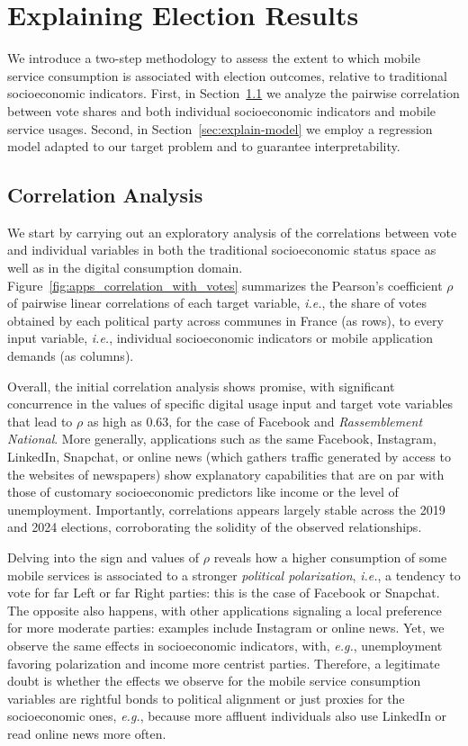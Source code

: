 \documentclass[9pt,sigconf,letterpaper]{acmart}
\newcommand{\eg}{\textit{e.g.},\xspace}
\newcommand{\ie}{\textit{i.e.},\xspace}
\newcommand{\RN}{\textsl{Rassemblement National}\xspace}
\begin{document}
\section{Explaining Election Results}
\label{sec:explain}

We introduce a two-step methodology to assess the extent to which mobile service consumption is associated with election outcomes, relative to traditional socioeconomic indicators.
First, in Section~\ref{sec:explain-correlation} we analyze the pairwise correlation between vote shares and both individual socioeconomic indicators and mobile service usages.
Second, in Section~\ref{sec:explain-model} we employ a regression model adapted to our target problem and to guarantee interpretability.

\subsection{Correlation Analysis}
\label{sec:explain-correlation}

We start by carrying out an exploratory analysis of the correlations between vote and individual variables in both the traditional socioeconomic status space as well as in the digital consumption domain.
%
Figure~\ref{fig:apps_correlation_with_votes} summarizes the Pearson's coefficient $\rho$ of pairwise linear correlations of each target variable, \ie the share of votes obtained by each political party across communes in France (as rows), to every input variable, \ie individual socioeconomic indicators or mobile application demands (as columns).

Overall, the initial correlation analysis shows promise, with significant concurrence in the values of specific digital usage input and target vote variables that lead to $\rho$ as high as $0.63$, for the case of Facebook and \RN. More generally, applications such as the same Facebook, Instagram, LinkedIn, Snapchat, or online news (which gathers traffic generated by access to the websites of newspapers) show explanatory capabilities that are on par with those of customary socioeconomic predictors like income or the level of unemployment. Importantly, correlations appears largely stable across the 2019 and 2024 elections, corroborating the solidity of the observed relationships.

Delving into the sign and values of $\rho$ reveals how a higher consumption of some mobile services is associated to a stronger \textit{political polarization}, \ie a tendency to vote for far Left or far Right parties: this is the case of Facebook or Snapchat. The opposite also happens, with other applications signaling a local preference for more moderate parties: examples include Instagram or online news.
Yet, we observe the same effects in socioeconomic indicators, with, \eg unemployment favoring polarization and income more centrist parties.
Therefore, a legitimate doubt is whether the effects we observe for the mobile service consumption variables are rightful bonds to political alignment or just proxies for the socioeconomic ones, \eg because more affluent individuals also use LinkedIn or read online news more often.
\end{document}
